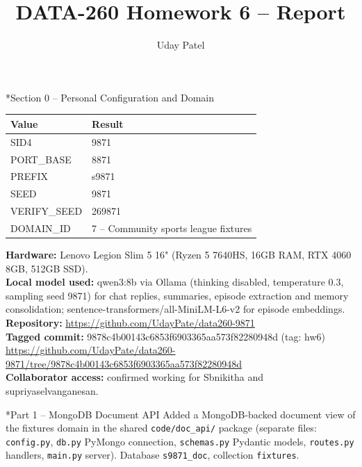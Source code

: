 \documentclass[11pt]{article}
\title{DATA-260 Homework 6 -- Report}
\author{Uday Patel}
\date{}
\makeatletter
\renewcommand\section{\@startsection{section}{1}{\z@}{-3.0ex \@plus -1ex \@minus -.2ex}{1.2ex \@plus.2ex}{\normalfont\fontsize{14}{17}\selectfont\bfseries}}
\makeatother
\begin{document}
\maketitle

\section*{Section 0 -- Personal Configuration and Domain}
\begin{tabular}{|l|l|}\hline
\textbf{Value} & \textbf{Result} \\\hline
SID4 & 9871 \\\hline
PORT\_BASE & 8871 \\\hline
PREFIX & s9871 \\\hline
SEED & 9871 \\\hline
VERIFY\_SEED & 269871 \\\hline
DOMAIN\_ID & 7 -- Community sports league fixtures \\\hline
\end{tabular}
\vspace{1em}

\textbf{Hardware:} Lenovo Legion Slim 5 16" (Ryzen 5 7640HS, 16GB RAM, RTX 4060 8GB, 512GB SSD). \\
\textbf{Local model used:} qwen3:8b via Ollama (thinking disabled, temperature 0.3, sampling seed 9871) for chat replies, summaries, episode extraction and memory consolidation; sentence-transformers/all-MiniLM-L6-v2 for episode embeddings. \\
\textbf{Repository:} \url{https://github.com/UdayPate/data260-9871} \\
\textbf{Tagged commit:} 9878c4b00143c6853f6903365aa573f82280948d (tag: hw6) \\
{\footnotesize\url{https://github.com/UdayPate/data260-9871/tree/9878c4b00143c6853f6903365aa573f82280948d}} \\
\textbf{Collaborator access:} confirmed working for Sbnikitha and supriyaselvanganesan.

\section*{Part 1 -- MongoDB Document API}
Added a MongoDB-backed document view of the fixtures domain in the shared \verb|code/doc_api/| package (separate files: \verb|config.py|, \verb|db.py| PyMongo connection, \verb|schemas.py| Pydantic models, \verb|routes.py| handlers, \verb|main.py| server). Database \verb|s9871_doc|, collection \verb|fixtures|.
\end{document}
